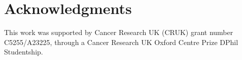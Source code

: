 %
%


\section*{Acknowledgments}
This work was supported by Cancer Research UK (CRUK) grant number C5255/A23225, through a Cancer Research UK Oxford Centre Prize DPhil Studentship. 

